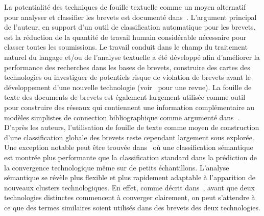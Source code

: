 {La potentialité des techniques de fouille textuelle comme un moyen alternatif pour analyser et classifier les brevets est documenté dans~\cite{tseng2007text}. L'argument principal de l'auteur, en support d'un outil de classification automatique pour les brevets, est la réduction de la quantité de travail humain considérable nécessaire pour classer toutes les soumissions. Le travail conduit dans le champ du traitement naturel du langage et/ou de l'analyse textuelle a été développé afin d'améliorer la performance des recherches dans les bases de brevets, construire des cartes des technologies ou investiguer de potentiels risque de violation de brevets avant le développement d'une nouvelle technologie (voir~\cite{abbas2014literature} pour une revue). La fouille de texte des documents de brevets est également largement utilisée comme outil pour construire des réseaux qui contiennent une information complémentaire au modèles simplistes de connection bibliographique comme argumenté dans~\cite{yoon2004text}. D'après les auteurs, l'utilisation de fouille de texte comme moyen de construction d'une classification globale des brevets reste cependant largement sous explorée. Une exception notable peut être trouvée dans~\cite{preschitschek2013} où une classification sémantique est montrée plus performante que la classification standard dans la prédiction de la convergence technologique même sur de petits échantillons. L'analyse sémantique se révèle plus flexible et plus rapidement adaptable à l'apparition de nouveaux clusters technologiques. En effet, comme décrit dans~\cite{preschitschek2013}, avant que deux technologies distinctes commencent à converger clairement, on peut s'attendre à ce que des termes similaires soient utilisés dans des brevets des deux technologies.
}

